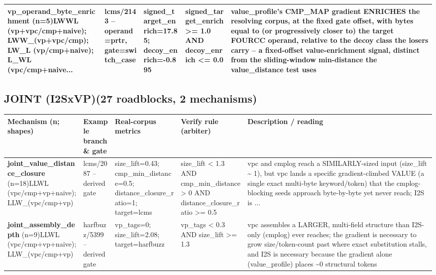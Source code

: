 \documentclass[7pt]{extarticle}
\begin{document}
{\begin{longtable}{@{}p{3.3cm}p{3.6cm}p{4.4cm}p{4.2cm}p{6.6cm}@{}}
\textbf{vp\_\allowbreak operand\_\allowbreak byte\_\allowbreak enrichment} (n=5)\newline LWWL (vp+vpc/cmp+naive); LWW\_\allowbreak  (vp+vpc/cmp); LW\_\allowbreak L (vp/cmp+naive); L\_\allowbreak WL (vpc/cmp+naive... & lcms/2143 -- operand=prtr, gate=switch\_\allowbreak case & signed\_\allowbreak target\_\allowbreak enrich=17.85; decoy\_\allowbreak enrich=-0.895 & signed\_\allowbreak target\_\allowbreak enrich \textgreater{}= 1.0 AND decoy\_\allowbreak enrich \textless{}= 0.0 & value\_\allowbreak profile's CMP\_\allowbreak MAP gradient ENRICHES the resolving corpus, at the fixed gate offset, with bytes equal to (or progressively closer to) the target FOURCC operand, relative to the decoy class the losers carry -- a fixed-offset value-enrichment signal, distinct from the sliding-window min-distance the value\_\allowbreak distance test uses\\\midrule
\bottomrule\end{longtable}}\par\medskip
\subsection*{JOINT (I2SxVP)\quad(27 roadblocks, 2 mechanisms)}
{\scriptsize\begin{longtable}{@{}p{3.3cm}p{3.6cm}p{4.4cm}p{4.2cm}p{6.6cm}@{}}
\toprule \textbf{Mechanism (n; shapes)}&\textbf{Example branch \& gate}&\textbf{Real-corpus metrics}&\textbf{Verify rule (arbiter)}&\textbf{Description / reading}\\\midrule\endhead
\textbf{joint\_\allowbreak value\_\allowbreak distance\_\allowbreak closure} (n=18)\newline LLWL (vpc/cmp+vp+naive); LLW\_\allowbreak  (vpc/cmp+vp) & lcms/2087 -- derived gate & size\_\allowbreak lift=0.43; cmp\_\allowbreak min\_\allowbreak distance=0.5; distance\_\allowbreak closure\_\allowbreak ratio=1; target=lcms & size\_\allowbreak lift \textless{} 1.3 AND cmp\_\allowbreak min\_\allowbreak distance \textgreater{} 0 AND distance\_\allowbreak closure\_\allowbreak ratio \textgreater{}= 0.5 & vpc and cmplog reach a SIMILARLY-sized input (size\_\allowbreak lift \textasciitilde{} 1), but vpc lands a specific gradient-climbed VALUE (a single exact multi-byte keyword/token) that the cmplog-blocking seeds approach byte-by-byte yet never reach; I2S is ...\\\midrule
\textbf{joint\_\allowbreak assembly\_\allowbreak depth} (n=9)\newline LLWL (vpc/cmp+vp+naive); LLW\_\allowbreak  (vpc/cmp+vp) & harfbuzz/5399 -- derived gate & vp\_\allowbreak tags=0; size\_\allowbreak lift=2.08; target=harfbuzz & vp\_\allowbreak tags \textless{} 0.3 AND size\_\allowbreak lift \textgreater{}= 1.3 & vpc assembles a LARGER, multi-field structure than I2S-only (cmplog) ever reaches; the gradient is necessary to grow size/token-count past where exact substitution stalls, and I2S is necessary because the gradient alone (value\_\allowbreak profile) places \textasciitilde{}0 structural tokens\\\midrule
\bottomrule\end{longtable}}\par\medskip
\end{document}
